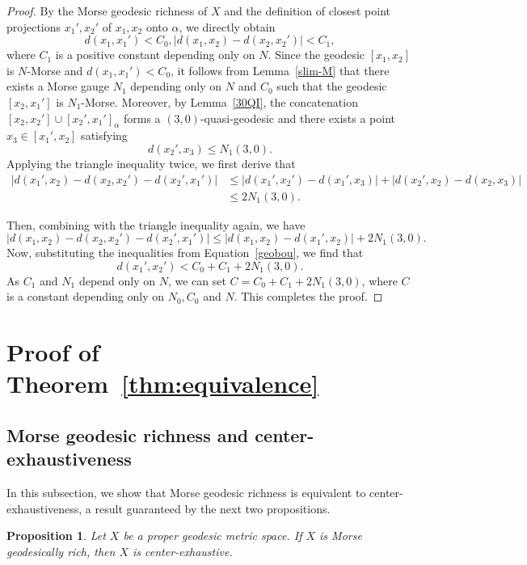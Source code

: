\documentclass[a4paper,11pt,oneside]{article}
\newtheorem{Proposition}[Theorem]{Proposition}
\begin{document}
\begin{proof}
By the Morse geodesic richness of $X$ and the definition of closest point projections $x_1', x_2'$ of $x_1, x_2$ onto $\alpha$, we directly obtain
\begin{equation}\label{geobou}
    d(x_1, x_1')<C_0, \left|d(x_1, x_2)-d(x_2, x_2')\right|< C_1,
\end{equation}
 where $C_1$ is a positive constant depending only on $N$.
Since the geodesic $[x_1, x_2]$ is $N$-Morse and $d(x_1, x_1')<C_0$, it follows from Lemma~\ref{slim-M} that there exists a Morse gauge $N_1$ depending only on $N$ and $C_0$ such that the geodesic $[x_2, x_1']$ is $N_1$-Morse. 
Moreover, by Lemma~\ref{30QI}, the concatenation $[x_2, x_2']\cup[x_2', x_1']_{\alpha}$ forms a $(3, 0)$-quasi-geodesic and there exists a point $x_3\in [x_1', x_2]$ satisfying 
    \[d(x_2', x_3)\le N_1(3,0).\]
    Applying the triangle inequality twice, we first derive that 
    \[
\begin{aligned}
\left|d(x_1',x_2)-d(x_2,x_2')-d(x_2',x_1')\right|
&\le \left|d(x_1',x_2')-d(x_1',x_3)\right| + \left|d(x_2',x_2)-d(x_2,x_3)\right| \\
&\le 2N_1(3, 0).
\end{aligned}
\]

Then, combining with the triangle inequality again, we have 
$$\left|d(x_1,x_2)-d(x_2,x_2')-d(x_2', x_1')\right|\le \left|d(x_1,x_2)-d(x_1',x_2)\right|+2N_1(3, 0).$$
Now, substituting the inequalities from Equation~\eqref{geobou}, we find that
\[d(x_1', x_2')<C_0+C_1+2N_1(3, 0).\] 
As $C_1$ and $N_1$ depend only on $N$, we can set $C=C_0+C_1+2N_1(3, 0)$, where $C$ is a constant depending only on $N_0, C_0$ and $N$. This completes the proof.

    
\end{proof}


\section{Proof of Theorem~\ref{thm:equivalence}}

\subsection{Morse geodesic richness and center-exhaustiveness}
In this subsection, we show that Morse geodesic richness is equivalent to center-exhaustiveness, a result guaranteed by the next two propositions.

\begin{Proposition}\label{MGR-CCF}
   Let $X$ be a proper geodesic metric space. If $X$ is Morse geodesically rich, then $X$ is center-exhaustive. 
\end{Proposition}
\end{document}
